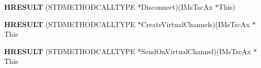 \begin{DoxyCompactItemize}
\item 
\mbox{\label{struct_i_ms_tsc_ax_vtbl_a89aafe1bcdb66d43d2525722af767986}} 
{\bfseries H\+R\+E\+S\+U\+LT} (S\+T\+D\+M\+E\+T\+H\+O\+D\+C\+A\+L\+L\+T\+Y\+PE $\ast$Disconnect)(I\+Ms\+Tsc\+Ax $\ast$This)
\item 
\mbox{\label{struct_i_ms_tsc_ax_vtbl_a89b34607a8272bdc4c9e66e45ca5362c}} 
{\bfseries H\+R\+E\+S\+U\+LT} (S\+T\+D\+M\+E\+T\+H\+O\+D\+C\+A\+L\+L\+T\+Y\+PE $\ast$Create\+Virtual\+Channels)(I\+Ms\+Tsc\+Ax $\ast$This
\item 
\mbox{\label{struct_i_ms_tsc_ax_vtbl_a8c3a7cb2871803bf34dcac7196a7083b}} 
{\bfseries H\+R\+E\+S\+U\+LT} (S\+T\+D\+M\+E\+T\+H\+O\+D\+C\+A\+L\+L\+T\+Y\+PE $\ast$Send\+On\+Virtual\+Channel)(I\+Ms\+Tsc\+Ax $\ast$This
\end{DoxyCompactItemize}
